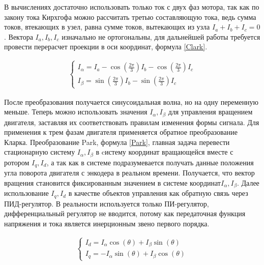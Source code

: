 В вычислениях достаточно использовать только ток с двух фаз мотора, так как по закону тока Кирхгофа можно рассчитать третью составляющую тока, ведь сумма токов, втекающих в узел, равна сумме токов, вытекающих из узла $I_a+I_b+I_c=0$. Вектора $I_a,I_b,I_c$ изначально не ортогональны, для дальнейшей работы требуется провести перерасчет проекции в оси координат, формула \ref{Clark}.
\begin{ceqn}
	\begin{align} \label{Clark}
		\begin{cases}
			I_{\alpha} = I_a - \cos\left(\frac{2\pi}{3}\right) I_b - \cos\left(\frac{2\pi}{3}\right) I_c \\
			I_{\beta} = \sin\left(\frac{2\pi}{3}\right) I_b - \sin\left(\frac{2\pi}{3}\right) I_c
		\end{cases}
	\end{align}
\end{ceqn}

После преобразования получается синусоидальная волна, но на одну переменную меньше. Теперь можно использовать значения $I_\alpha,I_\beta$ для управления вращением двигателя, заставляя их соответствовать правилам изменения формы сигнала. Для применения к трем фазам двигателя применяется обратное преобразование Кларка.
Преобразование Park, формула \ref{Park}, главная задача перевести стационарную систему $I_\alpha,I_\beta$ в cистему координат вращающейся вместе с ротором $I_q,I_d$, а так как в системе подразумевается получать данные положения угла поворота двигателя с энкодера в реальном времени. Получается, что вектор вращения становится фиксированным значением в системе координат$I_\alpha,I_\beta$.  Далее использование $I_q,I_d$ в качестве объектов управления как обратную связь через ПИД-регулятор. В реальности используется только ПИ-регулятор, дифференциальный регулятор не вводится, потому как передаточная функция напряжения и тока является инерционным звено первого порядка.

\begin{ceqn}
	\begin{align} \label{Park}
		\begin{cases}
			I_d = I_\alpha \cos(\theta) + I_\beta \sin(\theta) \\
			I_q = -I_\alpha \sin(\theta) + I_\beta \cos(\theta)
		\end{cases}
	\end{align}
\end{ceqn}





